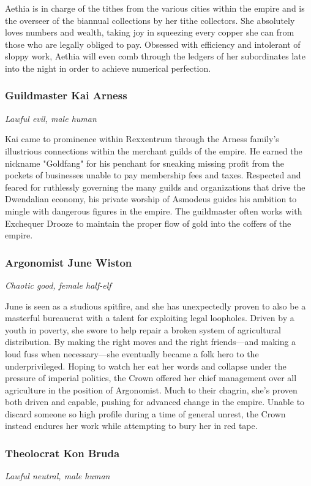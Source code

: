 \documentclass[10pt,a4paper,twoside,bg=print,twocolumn,openany,nodeprecatedcode]{dndbook}
\begin{document}
Aethia is in charge of the tithes from the various cities within the empire and is the overseer of the biannual collections by her tithe collectors. She absolutely loves numbers and wealth, taking joy in squeezing every copper she can from those who are legally obliged to pay. Obsessed with efficiency and intolerant of sloppy work, Aethia will even comb through the ledgers of her subordinates late into the night in order to achieve numerical perfection.

\subsubsection{Guildmaster Kai Arness}
\textit{Lawful evil, male human}

Kai came to prominence within Rexxentrum through the Arness family's illustrious connections within the merchant guilds of the empire. He earned the nickname "Goldfang" for his penchant for sneaking missing profit from the pockets of businesses unable to pay membership fees and taxes. Respected and feared for ruthlessly governing the many guilds and organizations that drive the Dwendalian economy, his private worship of Asmodeus guides his ambition to mingle with dangerous figures in the empire. The guildmaster often works with Exchequer Drooze to maintain the proper flow of gold into the coffers of the empire.

\subsubsection{Argonomist June Wiston}
\textit{Chaotic good, female half-elf}

June is seen as a studious spitfire, and she has unexpectedly proven to also be a masterful bureaucrat with a talent for exploiting legal loopholes. Driven by a youth in poverty, she swore to help repair a broken system of agricultural distribution. By making the right moves and the right friends—and making a loud fuss when necessary—she eventually became a folk hero to the underprivileged. Hoping to watch her eat her words and collapse under the pressure of imperial politics, the Crown offered her chief management over all agriculture in the position of Argonomist. Much to their chagrin, she's proven both driven and capable, pushing for advanced change in the empire. Unable to discard someone so high profile during a time of general unrest, the Crown instead endures her work while attempting to bury her in red tape.

\subsubsection{Theolocrat Kon Bruda}
\textit{Lawful neutral, male human}
\end{document}
